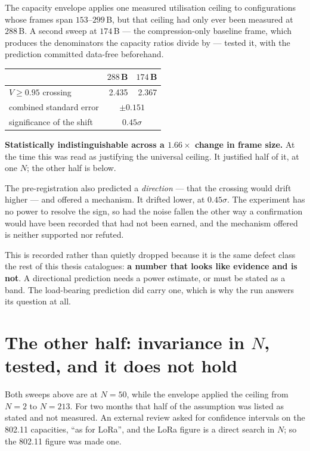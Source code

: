 The capacity envelope applies one measured utilisation ceiling to configurations whose frames span
$153$--$299$\,B, but that ceiling had only ever been measured at $288$\,B. A second sweep at
$174$\,B --- the compression-only baseline frame, which produces the denominators the capacity
ratios divide by --- tested it, with the prediction committed data-free beforehand.

\begin{center}
\begin{tabular}{lrr}
\toprule
& $288$\,B & $174$\,B \\
\midrule
$V \geq 0.95$ crossing & 2.435 & 2.367 \\
combined standard error & \multicolumn{2}{c}{$\pm 0.151$} \\
significance of the shift & \multicolumn{2}{c}{$0.45\sigma$} \\
\bottomrule
\end{tabular}
\end{center}

\textbf{Statistically indistinguishable across a $1.66\times$ change in frame size.} At the time
this was read as justifying the universal ceiling. It justified half of it, at one $N$; the other
half is below.

\begin{remark}
The pre-registration also predicted a \emph{direction} --- that the crossing would drift higher ---
and offered a mechanism. It drifted lower, at $0.45\sigma$. The experiment has no power to resolve
the sign, so had the noise fallen the other way a confirmation would have been recorded that had
not been earned, and the mechanism offered is neither supported nor refuted.

This is recorded rather than quietly dropped because it is the same defect class the rest of this
thesis catalogues: \textbf{a number that looks like evidence and is not}. A directional prediction
needs a power estimate, or must be stated as a band. The load-bearing prediction did carry one,
which is why the run answers its question at all.
\end{remark}

\section{The other half: invariance in $N$, tested, and it does not hold}

Both sweeps above are at $N = 50$, while the envelope applied the ceiling from $N = 2$ to
$N = 213$. For two months that half of the assumption was listed as stated and not measured. An
external review asked for confidence intervals on the 802.11 capacities, ``as for LoRa'', and the
LoRa figure is a direct search in $N$; so the 802.11 figure was made one.

